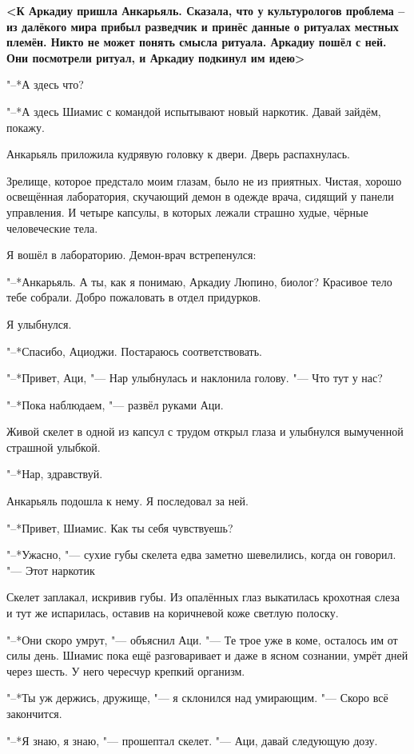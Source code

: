 \documentclass[a4paper,10pt]{book}
\newcommand{\ldotst}{\so{...}\xspace}
\begin{document}
\textbf{<К Аркадиу пришла Анкарьяль. Сказала, что у культурологов проблема – из 
далёкого мира прибыл разведчик и принёс данные о ритуалах местных племён. Никто 
не может понять смысла ритуала. Аркадиу пошёл с ней. Они посмотрели ритуал, и 
Аркадиу подкинул им идею>}

"--*А здесь что?

"--*А здесь Шиамис с командой испытывают новый наркотик. Давай зайдём, покажу.

Анкарьяль приложила кудрявую головку к двери. Дверь распахнулась.

Зрелище, которое предстало моим глазам, было не из приятных. Чистая, хорошо 
освещённая лаборатория, скучающий демон в одежде врача, сидящий у панели 
управления. И четыре капсулы, в которых лежали страшно худые, чёрные 
человеческие тела.

Я вошёл в лабораторию. Демон-врач встрепенулся:

"--*Анкарьяль. А ты, как я понимаю, Аркадиу Люпино, биолог? Красивое тело 
тебе собрали. Добро пожаловать в отдел придурков.

Я улыбнулся.

"--*Спасибо, Ациоджи. Постараюсь соответствовать.

"--*Привет, Аци, "--- Нар улыбнулась и наклонила голову. "--- Что тут у нас?

"--*Пока наблюдаем, "--- развёл руками Аци.

Живой скелет в одной из капсул с трудом открыл глаза и улыбнулся вымученной 
страшной улыбкой.

"--*Нар, здравствуй.

Анкарьяль подошла к нему. Я последовал за ней.

"--*Привет, Шиамис. Как ты себя чувствуешь?

"--*Ужасно, "--- сухие губы скелета едва заметно шевелились, когда он говорил. 
"--- Этот наркотик\ldotst

Скелет заплакал, искривив губы. Из опалённых глаз выкатилась крохотная слеза и 
тут же испарилась, оставив на коричневой коже светлую полоску.

"--*Они скоро умрут, "--- объяснил Аци. "--- Те трое уже в коме, осталось им от 
силы день. Шиамис пока ещё разговаривает и даже в ясном сознании, умрёт дней 
через шесть. У него чересчур крепкий организм.

"--*Ты уж держись, дружище, "--- я склонился над умирающим. "--- Скоро всё 
закончится.

"--*Я знаю, я знаю, "--- прошептал скелет. "--- Аци, давай следующую дозу.
\end{document}
